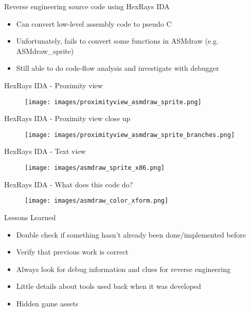 \documentclass{beamer}
\begin{document}

\begin{frame}{Reverse engineering source code using HexRays IDA}
	\begin{itemize}
		\item Can convert low-level assembly code to pseudo C
		\item Unfortunately, fails to convert some functions in ASMdraw (e.g. ASMdraw\_sprite)
		\item Still able to do code-flow analysis and investigate with debugger
	\end{itemize}
\end{frame}


\begin{frame}{HexRays IDA - Proximity view}
	\begin{figure}
	\hspace*{-10mm}
	\texttt{[image: images/proximityview\_asmdraw\_sprite.png]}
	\end{figure}
\end{frame}


\begin{frame}{HexRays IDA - Proximity view close up}
	\begin{figure}
	\hspace*{-10mm}
	\texttt{[image: images/proximityview\_asmdraw\_sprite\_branches.png]}
	\end{figure}
\end{frame}


\begin{frame}{HexRays IDA - Text view}
	\begin{figure}
	\hspace*{-10mm}
	\texttt{[image: images/asmdraw\_sprite\_x86.png]}
	\end{figure}
\end{frame}


\begin{frame}{HexRays IDA - What does this code do?}
	\begin{figure}
	\hspace*{-10mm}
	\texttt{[image: images/asmdraw\_color\_xform.png]}
	\end{figure}
\end{frame}


\begin{frame}{Lessons Learned}
	\begin{itemize}
		\item Double check if something hasn't already been done/implemented before
		\item Verify that previous work is correct
		\item Always look for debug information and clues for reverse engineering
		\item Little details about tools used back when it was developed
		\item Hidden game assets
	\end{itemize}

\end{frame}
\end{document}
